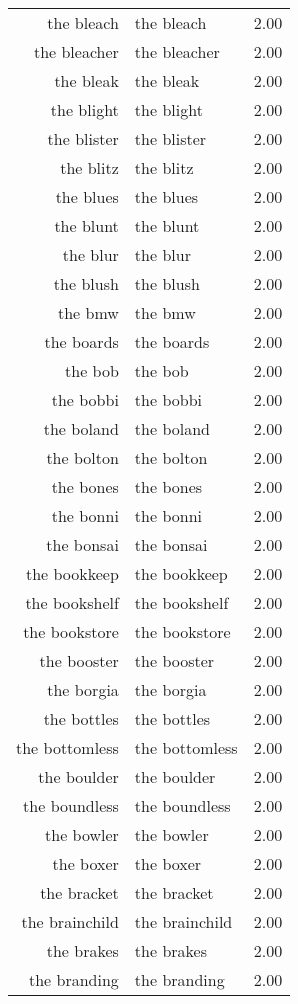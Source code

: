 \begin{table}[ht]
\begin{tabular}{rlr}
  the bleach & the bleach & 2.00 \\ 
  the bleacher & the bleacher & 2.00 \\ 
  the bleak & the bleak & 2.00 \\ 
  the blight & the blight & 2.00 \\ 
  the blister & the blister & 2.00 \\ 
  the blitz & the blitz & 2.00 \\ 
  the blues & the blues & 2.00 \\ 
  the blunt & the blunt & 2.00 \\ 
  the blur & the blur & 2.00 \\ 
  the blush & the blush & 2.00 \\ 
  the bmw & the bmw & 2.00 \\ 
  the boards & the boards & 2.00 \\ 
  the bob & the bob & 2.00 \\ 
  the bobbi & the bobbi & 2.00 \\ 
  the boland & the boland & 2.00 \\ 
  the bolton & the bolton & 2.00 \\ 
  the bones & the bones & 2.00 \\ 
  the bonni & the bonni & 2.00 \\ 
  the bonsai & the bonsai & 2.00 \\ 
  the bookkeep & the bookkeep & 2.00 \\ 
  the bookshelf & the bookshelf & 2.00 \\ 
  the bookstore & the bookstore & 2.00 \\ 
  the booster & the booster & 2.00 \\ 
  the borgia & the borgia & 2.00 \\ 
  the bottles & the bottles & 2.00 \\ 
  the bottomless & the bottomless & 2.00 \\ 
  the boulder & the boulder & 2.00 \\ 
  the boundless & the boundless & 2.00 \\ 
  the bowler & the bowler & 2.00 \\ 
  the boxer & the boxer & 2.00 \\ 
  the bracket & the bracket & 2.00 \\ 
  the brainchild & the brainchild & 2.00 \\ 
  the brakes & the brakes & 2.00 \\ 
  the branding & the branding & 2.00 \\ 

\end{tabular}
\end{table}
